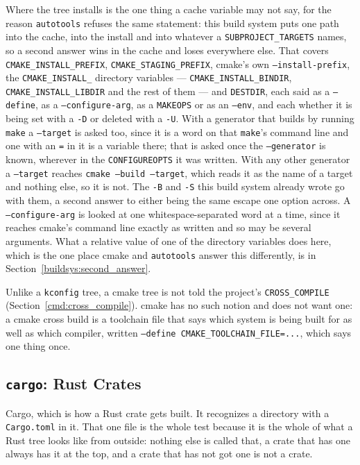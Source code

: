 \documentclass{article}
\begin{document}
Where the tree installs is the one thing a cache variable may not say,
for the reason \texttt{autotools} refuses the same statement: this
build system puts one path into the cache, into the install and into
whatever a \texttt{SUBPROJECT\_TARGETS} names, so a second answer wins
in the cache and loses everywhere else.  That covers
\texttt{CMAKE\_INSTALL\_PREFIX}, \texttt{CMAKE\_STAGING\_PREFIX},
cmake's own \texttt{--install-prefix}, the
\texttt{CMAKE\_INSTALL\_} directory variables ---
\texttt{CMAKE\_INSTALL\_BINDIR}, \texttt{CMAKE\_INSTALL\_LIBDIR}
and the rest of them --- and \texttt{DESTDIR}, each said as a
\texttt{--define}, as a \texttt{--configure-arg}, as a
\texttt{MAKEOPS} or as an \texttt{--env}, and each whether it is
being set with a \texttt{-D} or deleted with a \texttt{-U}.  With a
generator that builds by running \texttt{make} a \texttt{--target}
is asked too, since it is a word on that \texttt{make}'s command line
and one with an \texttt{=} in it is a variable there; that is asked
once the \texttt{--generator} is known, wherever in the
\texttt{CONFIGUREOPTS} it was written.  With any other generator a
\texttt{--target} reaches \texttt{cmake --build --target}, which
reads it as the name of a target and nothing else, so it is not.  The
\texttt{-B} and \texttt{-S} this build system already wrote go with
them, a second answer to either being the same escape one option
across.  A \texttt{--configure-arg} is looked at one
whitespace-separated word at a time, since it reaches cmake's command
line exactly as written and so may be several arguments.  What a
relative value of one of the directory variables does here, which is
the one place cmake and \texttt{autotools} answer this differently,
is in Section~\ref{buildsys:second_answer}.

Unlike a \texttt{kconfig} tree, a cmake tree is not told the project's
\texttt{CROSS\_COMPILE} (Section~\ref{cmd:cross_compile}).  cmake has
no such notion and does not want one: a cmake cross build is a
toolchain file that says which system is being built for as well as
which compiler, written \texttt{--define CMAKE\_TOOLCHAIN\_FILE=...},
which says one thing once.

\subsection{\texttt{cargo}: Rust Crates \label{buildsys:cargo}}

Cargo, which is how a Rust crate gets built.  It recognizes a
directory with a \texttt{Cargo.toml} in it.  That one file is the
whole test because it is the whole of what a Rust tree looks like from
outside: nothing else is called that, a crate that has one always has
it at the top, and a crate that has not got one is not a crate.
\end{document}
